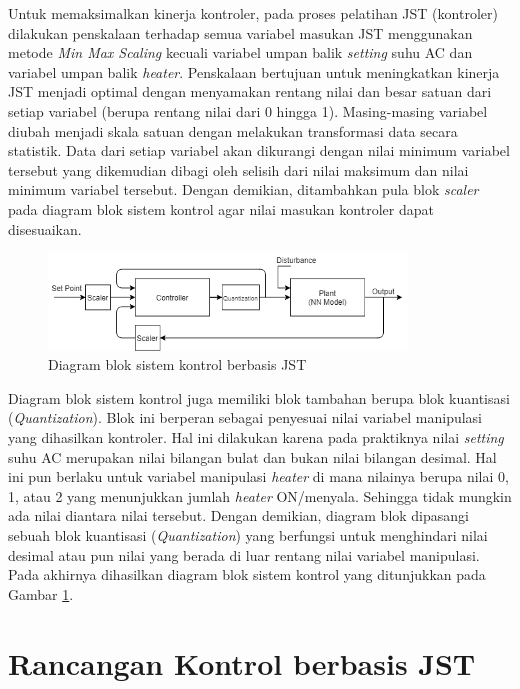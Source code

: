 Untuk memaksimalkan kinerja kontroler, pada proses pelatihan JST (kontroler) dilakukan penskalaan terhadap semua variabel masukan JST menggunakan metode \textit{Min Max Scaling} kecuali variabel umpan balik \textit{setting} suhu AC dan variabel umpan balik \textit{heater}. Penskalaan bertujuan untuk meningkatkan kinerja JST menjadi optimal dengan menyamakan rentang nilai dan besar satuan dari setiap variabel (berupa rentang nilai dari 0 hingga 1). Masing-masing variabel diubah menjadi skala satuan dengan melakukan transformasi data secara statistik. Data dari setiap variabel akan dikurangi dengan nilai minimum variabel tersebut yang dikemudian dibagi oleh selisih dari nilai maksimum dan nilai minimum variabel tersebut. Dengan demikian, ditambahkan pula blok \textit{scaler} pada diagram blok sistem kontrol agar nilai masukan kontroler dapat disesuaikan.

\begin{figure}[!h]
	\centering
	\includegraphics[width=0.85\textwidth]{figures/ControlDesignDiagramII}
	\caption{Diagram blok sistem kontrol berbasis JST}
	\label{fig:5:ConstrolSystemBlockDiagram}
\end{figure}

Diagram blok sistem kontrol juga memiliki blok tambahan berupa blok kuantisasi (\textit{Quantization}). Blok ini berperan sebagai penyesuai nilai variabel manipulasi yang dihasilkan kontroler. Hal ini dilakukan karena pada praktiknya nilai \textit{setting} suhu AC merupakan nilai bilangan bulat dan bukan nilai bilangan desimal. Hal ini pun berlaku untuk variabel manipulasi \textit{heater} di mana nilainya berupa nilai 0, 1, atau 2 yang menunjukkan jumlah \textit{heater} ON/menyala. Sehingga tidak mungkin ada nilai diantara nilai tersebut. Dengan demikian, diagram blok dipasangi sebuah blok kuantisasi (\textit{Quantization}) yang berfungsi untuk menghindari nilai desimal atau pun nilai yang berada di luar rentang nilai variabel manipulasi. Pada akhirnya dihasilkan diagram blok sistem kontrol yang ditunjukkan pada Gambar \ref{fig:5:ConstrolSystemBlockDiagram}.

\section{Rancangan Kontrol berbasis JST}


